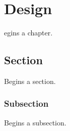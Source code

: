 \let\textcircled=\pgftextcircled
\chapter{Design}
\label{chap:design}

egins a chapter. 

\section{Section}
\label{sec:sec01}

Begins a section.

\subsection{Subsection}
\label{subsec:subsec01}

Begins a subsection.